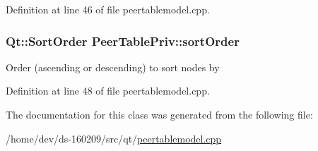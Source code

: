 Definition at line 46 of file peertablemodel.\+cpp.

\hypertarget{class_peer_table_priv_adb95d4bbc4fb13a21a360108aeca5c32}{}
\subsubsection[{sort\+Order}]{\setlength{\rightskip}{0pt plus 5cm}Qt\+::\+Sort\+Order Peer\+Table\+Priv\+::sort\+Order}\label{class_peer_table_priv_adb95d4bbc4fb13a21a360108aeca5c32}
Order (ascending or descending) to sort nodes by 

Definition at line 48 of file peertablemodel.\+cpp.



The documentation for this class was generated from the following file\+:\begin{DoxyCompactItemize}
\item 
/home/dev/ds-\/160209/src/qt/\hyperlink{peertablemodel_8cpp}{peertablemodel.\+cpp}\end{DoxyCompactItemize}
